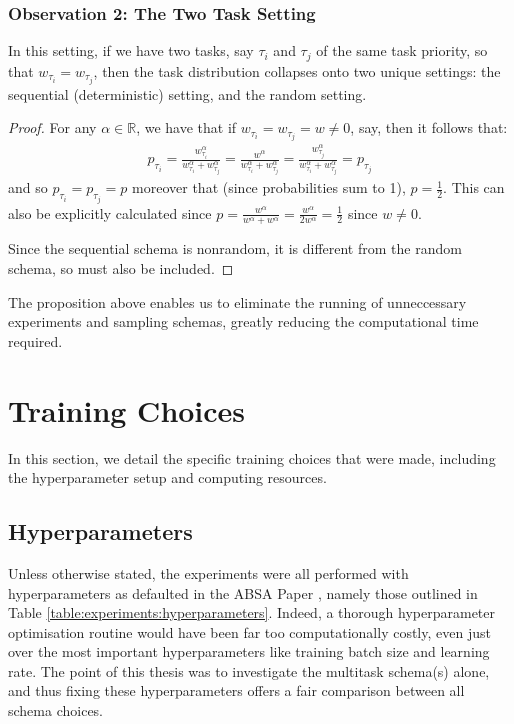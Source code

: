 \subsubsection{Observation 2: The Two Task Setting}
\begin{prop}
	In this setting, if we have two tasks, say $\tau_i$ and $\tau_j$ of the same task priority, so that $w_{\tau_i} = w_{\tau_j}$, then the task distribution collapses onto two unique settings: the sequential (deterministic) setting, and the random setting.
\end{prop}
\begin{proof}
	For any $\alpha \in \mathbb{R}$, we have that if $w_{\tau_i} = w_{\tau_j} = w \neq 0$, say, then it follows that:
	\begin{align*}
	p_{\tau_i} = \frac{w_{\tau_i}^{\alpha}}{w_{\tau_i}^{\alpha} + w_{\tau_j}^{\alpha}} = \frac{w^{\alpha}}{w_{\tau_i}^{\alpha} + w_{\tau_j}^{\alpha}} = \frac{w_{\tau_j}^{\alpha}}{w_{\tau_i}^{\alpha} + w_{\tau_j}^{\alpha}} = p_{\tau_j}
	\end{align*}
	and so $p_{\tau_i} = p_{\tau_j} = p$ moreover that (since probabilities sum to 1), $p=\frac{1}{2}$. This can also be explicitly calculated since $p = \frac{w^{\alpha}}{w^{\alpha} + w^{\alpha}} = \frac{w^\alpha}{2w^\alpha}= \frac{1}{2}$ since $w \neq 0$.
	
	Since the sequential schema is nonrandom, it is different from the random schema, so must also be included.
\end{proof}

The proposition above enables us to eliminate the running of unneccessary experiments and sampling schemas, greatly reducing the computational time required.

\section{Training Choices} \label{section:experiments:training}
In this section, we detail the specific training choices that were made, including the hyperparameter setup and computing resources.
\subsection{Hyperparameters} \label{section:experiments:hyperparameters}
Unless otherwise stated, the experiments were all performed with hyperparameters as defaulted in the ABSA Paper \cite{Sun2019}, namely those outlined in Table \ref{table:experiments:hyperparameters}. Indeed, a thorough hyperparameter optimisation routine would have been far too computationally costly, even just over the most important hyperparameters like training batch size and learning rate. The point of this thesis was to investigate the multitask schema(s) alone, and thus fixing these hyperparameters offers a fair comparison between all schema choices. 

